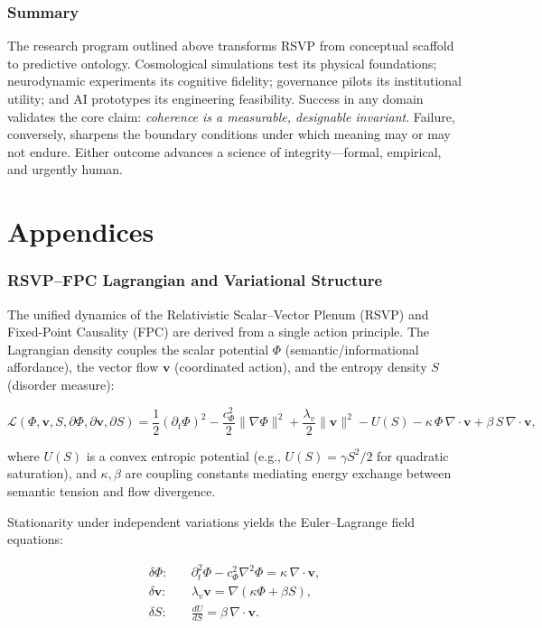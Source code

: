 \documentclass[12pt,a4paper]{article}
\begin{document}
\begin{enumerate}
\section*{Summary}

The research program outlined above transforms RSVP from conceptual scaffold to predictive ontology. Cosmological simulations test its physical foundations; neurodynamic experiments its cognitive fidelity; governance pilots its institutional utility; and AI prototypes its engineering feasibility. Success in any domain validates the core claim: \emph{coherence is a measurable, designable invariant}. Failure, conversely, sharpens the boundary conditions under which meaning may or may not endure. Either outcome advances a science of integrity—formal, empirical, and urgently human.

\clearpage
\appendix
\part*{Appendices}

\section{RSVP--FPC Lagrangian and Variational Structure}

The unified dynamics of the Relativistic Scalar--Vector Plenum (RSVP) and Fixed-Point Causality (FPC) are derived from a single action principle. The Lagrangian density couples the scalar potential $\Phi$ (semantic/informational affordance), the vector flow $\bm{v}$ (coordinated action), and the entropy density $S$ (disorder measure):

\begin{equation}
\mathcal{L}(\Phi,\bm{v},S,\partial\Phi,\partial\bm{v},\partial S)
= \frac{1}{2} (\partial_t \Phi)^2
- \frac{c_\Phi^2}{2} \|\nabla \Phi\|^2
+ \frac{\lambda_v}{2} \|\bm{v}\|^2
- U(S)
- \kappa \, \Phi \, \nabla\!\cdot\!\bm{v}
+ \beta \, S \, \nabla\!\cdot\!\bm{v},
\end{equation}

where $U(S)$ is a convex entropic potential (e.g., $U(S) = \gamma S^2 / 2$ for quadratic saturation), and $\kappa, \beta$ are coupling constants mediating energy exchange between semantic tension and flow divergence.

Stationarity under independent variations yields the Euler--Lagrange field equations:

\begin{align}
\delta \Phi: \quad
&\partial_t^2 \Phi - c_\Phi^2 \nabla^2 \Phi = \kappa \, \nabla\!\cdot\!\bm{v}, \\[4pt]
\delta \bm{v}: \quad
&\lambda_v \bm{v} = \nabla (\kappa \Phi + \beta S), \\[4pt]
\delta S: \quad
&\frac{dU}{dS} = \beta \, \nabla\!\cdot\!\bm{v}.
\end{align}


\end{enumerate}
\end{document}
